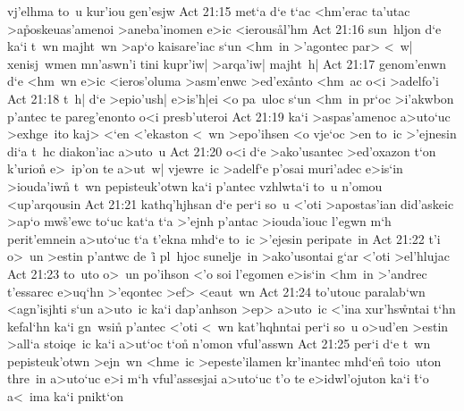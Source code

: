 vj'elhma
to~u
kur'iou
gen'esjw\bibvsend
\vs Act 21:15
met`a
d`e
t`ac
<hm'erac
ta'utac
>a\r{p}oskeuas'amenoi
>aneba'inomen
e>ic
<ierous\r{a}l'hm\bibvsend
{}
\vs Act 21:16
sun~hljon
d`e
ka`i
t~wn
majht~wn
>ap`o
kaisare'iac
s`un
<hm~in
>'agontec
par>
<~w|
xenisj~wmen
mn'aswn'i
tini
kupr'iw|
>arqa'iw|
majht~h|\bibvsend
\vs Act 21:17
genom'enwn
d`e
<hm~wn
e>ic
<ieros'oluma
>asm'enwc
>ed'ex\r{a}nto
<hm~ac
o<i
>adelfo'i\bibvsend
\vs Act 21:18
t~h|
d`e
>epio'ush|
e>is'h|ei
<o
pa~uloc
s`un
<hm~in
pr`oc
>i'akwbon
p'antec
te
pareg'enonto
o<i
presb'uteroi\bibvsend
\vs Act 21:19
ka`i
>aspas'amenoc
a>uto`uc
>exhge~ito
kaj>
<`en
<'ekaston
<~wn
>epo'ihsen
<o
vje`oc
>en
to~ic
>'ejnesin
di`a
t~hc
diakon'iac
a>uto~u\bibvsend
\vs Act 21:20
o<i
d`e
>ako'usantec
>ed'oxazon
t`on
k'urion\r{}
e>~ip'on
te
a>ut~w|
vjewre~ic
>adelf`e
p'osai
muri'adec
e>is`in
>iouda'iw\r{n}
t~wn
pepisteuk'otwn
ka`i
p'antec
vzhlwta`i
to~u
n'omou
<up'arqousin\bibvsend
\vs Act 21:21
kathq'hjhsan
d`e
per`i
so~u
<'oti
>apostas'ian
did'askeic
>ap`o
mw\r{s}'ewc
to`uc
kat`a
t`a
>'ejnh
p'antac
>iouda'iouc
l'egwn
m`h
perit'emnein
a>uto`uc
t`a
t'ekna
mhd`e
to~ic
>'ejesin
peripate~in\bibvsend
\vs Act 21:22
t'i
o>~un
>estin
p'antwc
de~i\r{}
pl~hjoc
sunelje~in
>ako'usontai
g`ar
<'oti
>el'hlujac\bibvsend
\vs Act 21:23
to~uto
o>~un
po'ihson
<'o
soi
l'egomen
e>is`in
<hm~in
>'andrec
t'essarec
e>uq`hn
>'eqontec
>ef>
<eaut~wn\bibvsend
\vs Act 21:24
to'utouc
paralab`wn
<agn'isjhti
s`un
a>uto~ic
ka`i
dap'anhson
>ep>
a>uto~ic
<'ina
xur'hs\r{w}ntai
t`hn
kefal`hn
ka`i
gn~wsi\r{n}
p'antec
<'oti
<~wn
kat'hqhntai
per`i
so~u
o>ud'en
>estin
>all`a
stoiqe~ic
ka`i
a>ut`oc
t`on\r{}
n'omon
vful'asswn\bibvsend
\vs Act 21:25
per`i
d`e
t~wn
pepisteuk'otwn
>ejn~wn
<hme~ic
>epeste'ilamen
kr'inantec
mhd`en\r{}
toio~uton
thre~in
a>uto`uc
e>i
m`h
vful'assesjai
a>uto`uc
t'o
te
e>idwl'ojuton
ka`i
\r{t}`o
a<~ima
ka`i
pnikt`on
